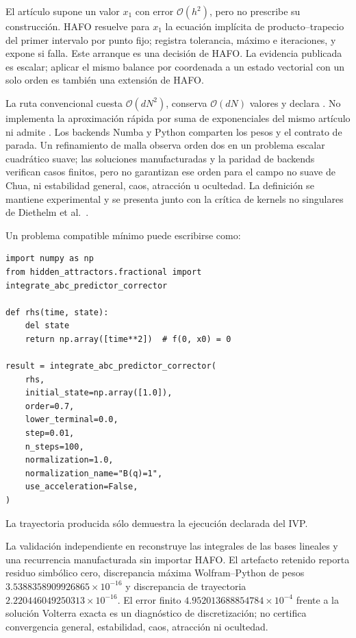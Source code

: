 El artículo supone un valor \(x_1\) con error \(\mathcal O(h^2)\), pero no
prescribe su construcción. HAFO resuelve para \(x_1\) la ecuación implícita de
producto--trapecio del primer intervalo por punto fijo; registra tolerancia,
máximo e iteraciones, y expone  si falla. Este
arranque es una decisión de HAFO. La evidencia publicada es escalar; aplicar el
mismo balance por coordenada a un estado vectorial con un solo orden es también
una extensión de HAFO.

La ruta convencional cuesta \(\mathcal O(dN^2)\), conserva
\(\mathcal O(dN)\) valores y declara . No
implementa la aproximación rápida por suma de exponenciales del mismo artículo
ni admite
. Los backends Numba y Python comparten los pesos y el
contrato de parada. Un refinamiento de malla observa orden dos en un problema
escalar cuadrático suave; las soluciones manufacturadas y la paridad de backends
verifican casos finitos, pero no garantizan ese orden para el campo no suave de Chua,
ni estabilidad general, caos, atracción u ocultedad. La definición se mantiene
experimental y se presenta junto con la crítica de kernels no singulares de
Diethelm et al.~\cite{DiethelmEtAl2020}.

Un problema compatible mínimo puede escribirse como:
\begin{verbatim}
import numpy as np
from hidden_attractors.fractional import integrate_abc_predictor_corrector

def rhs(time, state):
    del state
    return np.array([time**2])  # f(0, x0) = 0

result = integrate_abc_predictor_corrector(
    rhs,
    initial_state=np.array([1.0]),
    order=0.7,
    lower_terminal=0.0,
    step=0.01,
    n_steps=100,
    normalization=1.0,
    normalization_name="B(q)=1",
    use_acceleration=False,
)
\end{verbatim}
La trayectoria producida sólo demuestra la ejecución declarada del IVP.

La validación independiente en
 reconstruye las
integrales de las bases lineales y una recurrencia manufacturada sin importar
HAFO. El artefacto retenido reporta residuo simbólico cero, discrepancia máxima
Wolfram--Python de pesos \(3.5388358909926865\times10^{-16}\) y discrepancia de
trayectoria \(2.220446049250313\times10^{-16}\). El error finito
\(4.952013688854784\times10^{-4}\) frente a la solución Volterra exacta es un
diagnóstico de discretización; no certifica convergencia general, estabilidad,
caos, atracción ni ocultedad.

